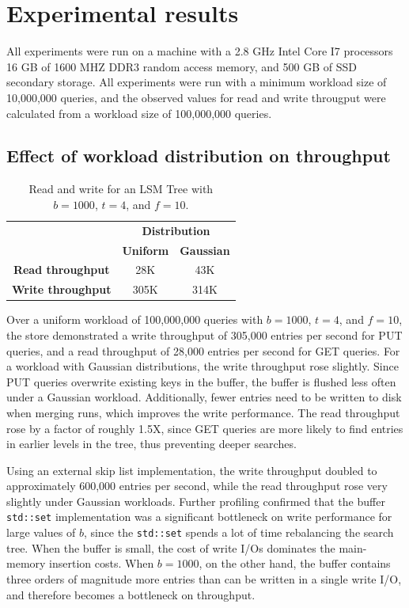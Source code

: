 \documentclass{acm}
\begin{document}
\section{Experimental results}

All experiments were run on a machine with a 2.8 GHz Intel Core I7 processors 16 GB of 1600 MHZ DDR3 random access memory, and 500 GB of SSD secondary storage. All experiments were run with a minimum workload size of 10,000,000 queries, and the observed values for read and write througput were calculated from a workload size of 100,000,000 queries.

\subsection{Effect of workload distribution on throughput}

\begin{table}[t]
\centering
\begin{tabular}{c|c|c|}
\cline{2-3}
\multicolumn{1}{l|}{} & \multicolumn{2}{c|}{\textbf{Distribution}} \\ \cline{2-3} 
 & \textbf{Uniform} & \textbf{Gaussian} \\ \hline
\multicolumn{1}{|c|}{\textbf{Read throughput}} & 28K & 43K \\ \hline
\multicolumn{1}{|c|}{\textbf{Write throughput}} & 305K & 314K \\ \hline
\end{tabular}
\caption{Read and write for an LSM Tree with $b = 1000$, $t = 4$, and $f = 10$.}
\vspace{-2em}
\end{table}

Over a uniform workload of 100,000,000 queries with $b = 1000$, $t = 4$, and $f = 10$, the store demonstrated a write throughput of 305,000 entries per second for PUT queries, and a read throughput of 28,000 entries per second for GET queries. For a workload with Gaussian distributions, the write throughput rose slightly. Since PUT queries overwrite existing keys in the buffer, the buffer is flushed less often under a Gaussian workload. Additionally, fewer entries need to be written to disk when merging runs, which improves the write performance. The read throughput rose by a factor of roughly 1.5X, since GET queries are more likely to find entries in earlier levels in the tree, thus preventing deeper searches.

Using an external skip list implementation, the write throughput doubled to approximately 600,000 entries per second, while the read throughput rose very slightly under Gaussian workloads. Further profiling confirmed that the buffer \texttt{std::set} implementation was a significant bottleneck on write performance for large values of $b$, since the \texttt{std::set} spends a lot of time rebalancing the search tree. When the buffer is small, the cost of write I/Os dominates the main-memory insertion costs. When $b=1000$, on the other hand, the buffer contains three orders of magnitude more entries than can be written in a single write I/O, and therefore becomes a bottleneck on throughput.
\end{document}
